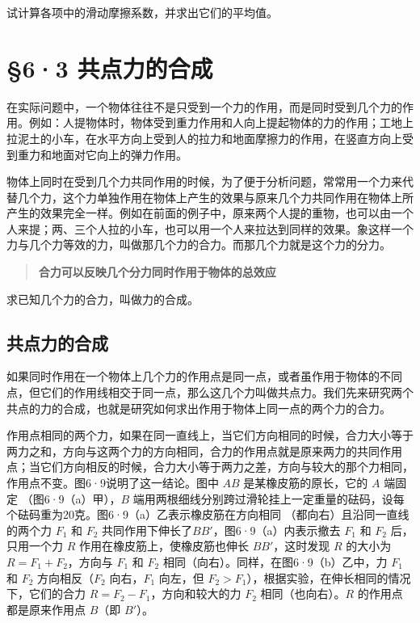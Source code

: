 试计算各项中的滑动摩擦系数，并求出它们的平均值。

\section{§6·3 共点力的合成}\label{ux5171ux70b9ux529bux7684ux5408ux6210}

在实际问题中，一个物体往往不是只受到一个力的作用，而是同时受到几个力的作用。例如：人提物体时，物体受到重力作用和人向上提起物体的力的作用；工地上拉泥土的小车，在水平方向上受到人的拉力和地面摩擦力的作用，在竖直方向上受到重力和地面对它向上的弹力作用。

物体上同时在受到几个力共同作用的时候，为了便于分析问题，常常用一个力来代替几个力，这个力单独作用在物体上产生的效果与原来几个力共同作用在物体上所产生的效果完全一样。例如在前面的例子中，原来两个人提的重物，也可以由一个人来提；两、三个人拉的小车，也可以用一个人来拉达到同样的效果。象这样一个力与几个力等效的力，叫做那几个力的合力。而那几个力就是这个力的分力。

\begin{quote}
\textbf{合力可以反映几个分力同时作用于物体的总效应}
\end{quote}

求已知几个力的合力，叫做力的合成。

\subsection{共点力的合成}\label{ux5171ux70b9ux529bux7684ux5408ux6210-1}

如果同时作用在一个物体上几个力的作用点是同一点，或者虽作用于物体的不同点，但它们的作用线相交于同一点，那么这几个力叫做共点力。我们先来研究两个共点的力的合成，也就是研究如何求出作用于物体上同一点的两个力的合力。

作用点相同的两个力，如果在同一直线上，当它们方向相同的时候，合力大小等于两力之和，方向与这两个力的方向相同，合力的作用点就是原来两力的共同作用点；当它们方向相反的时候，合力大小等于两力之差，方向与较大的那个力相同，作用点不变。图6·9说明了这一结论。图中
\(AB\) 是某橡皮筋的原长，它的 \(A\) 端固定 （图6·9（a）甲），\(B\)
端用两根细线分别跨过滑轮挂上一定重量的砝码，设每个砝码重为20克。图6·9（a）乙表示橡皮筋在方向相同
（都向右）且沿同一直线的两个力 \(F_{1}\) 和 \(F_{2}\)
共同作用下伸长了\(BB'\)，图6·9（a）内表示撤去 \(F_{1}\) 和 \(F_{2}\)
后，只用一个力 \(R\) 作用在橡皮筋上，使橡皮筋也伸长 \(BB'\)，这时发现
\(R\) 的大小为 \(R = F_{1} + F_{2}\)，方向与 \(F_{1}\) 和 \(F_{2}\)
相同（向右）。同样，在图6·9（b）乙中，力 \(F_{1}\) 和 \(F_{2}\)
方向相反（\(F_{2}\) 向右，\(F_{1}\) 向左，但
\(F_{2} > F_{1}\)），根据实验，在伸长相同的情况下，它们的合力
\(R = F_{2} - F_{1}\)，方向和较大的力 \(F_{2}\) 相同（也向右）。\(R\)
的作用点都是原来作用点 \(B\)（即 \(B'\)）。


